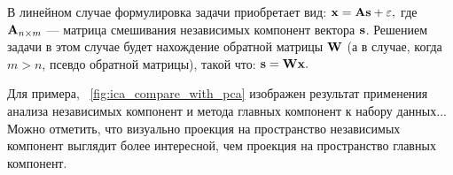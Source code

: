 В линейном случае формулировка задачи приобретает вид: $\mathrm{\mathbf{x}} = \mathrm{\mathbf{A}} \mathrm{\mathbf{s}} + \varepsilon,$ где $\mathrm{\mathbf{A}}_{n \times m}$ --- матрица смешивания независимых компонент вектора $\mathrm{\mathbf{s}}$. Решением задачи в этом случае будет нахождение обратной матрицы $\mathrm{\mathbf{W}}$ (а в случае, когда $m > n$, псевдо обратной матрицы), такой что: $\mathrm{\mathbf{s}} = \mathrm{\mathbf{W}} \mathrm{\mathbf{x}}.$


Для примера, \onfigure~\ref{fig:ica_compare_with_pca} изображен результат применения анализа независимых компонент и метода главных компонент к набору данных... Можно отметить, что визуально проекция на пространство независимых компонент выглядит более интересной, чем проекция на пространство главных компонент.

